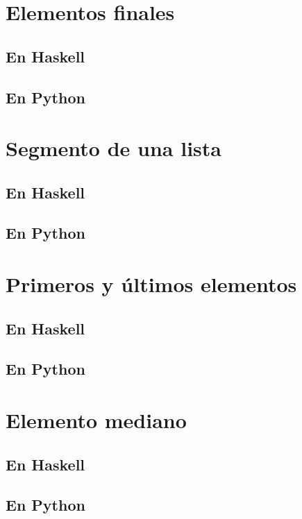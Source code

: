 \documentclass[a4paper,12pt,twoside]{book}
\begin{document}
\section{Elementos finales}
\subsection*{En Haskell}
\subsection*{En Python}

\section{Segmento de una lista}
\subsection*{En Haskell}
\subsection*{En Python}

\section{Primeros y últimos elementos}
\subsection*{En Haskell}
\subsection*{En Python}

\section{Elemento mediano}
\subsection*{En Haskell}
\subsection*{En Python}
\end{document}
